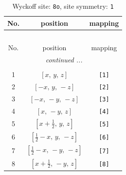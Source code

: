 \documentclass[fleqn,8pt]{jsarticle}
\begin{document}
\renewcommand{\arraystretch}{1.2}
\begin{longtable}{ccc}
\caption{Wyckoff site: {\tt 8o}, site symmetry: {\tt 1}}
 \\
 \hline \hline
No. & position & mapping \\ \hline \endfirsthead

\multicolumn{2}{l}{\tablename\ \thetable{}} \\
 \hline \hline
No. & position & mapping \\ \hline \endhead

 \hline \hline
\multicolumn{2}{r}{\footnotesize\it continued ...} \\ \endfoot

 \hline \hline
\multicolumn{2}{r}{} \\ \endlastfoot

1 & $\left[ x,\, y,\, z \right]$ & {\tt [1]} \\ \hline
2 & $\left[ - x,\, y,\, - z \right]$ & {\tt [2]} \\ \hline
3 & $\left[ - x,\, - y,\, - z \right]$ & {\tt [3]} \\ \hline
4 & $\left[ x,\, - y,\, z \right]$ & {\tt [4]} \\ \hline
5 & $\left[ x + \frac{1}{2},\, y,\, z \right]$ & {\tt [5]} \\ \hline
6 & $\left[ \frac{1}{2} - x,\, y,\, - z \right]$ & {\tt [6]} \\ \hline
7 & $\left[ \frac{1}{2} - x,\, - y,\, - z \right]$ & {\tt [7]} \\ \hline
8 & $\left[ x + \frac{1}{2},\, - y,\, z \right]$ & {\tt [8]} \\
\end{longtable}
\end{document}
